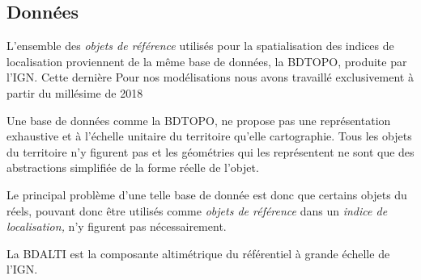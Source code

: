 \subsection{Données}

L'ensemble des \emph{objets de référence} utilisés pour la
spatialisation des indices de localisation proviennent de la même base
de données, la BDTOPO, produite par l'IGN. Cette dernière
%
Pour nos modélisations nous avons travaillé exclusivement à partir du
millésime de 2018


Une base de données comme la BDTOPO, ne propose pas une représentation
exhaustive et à l'échelle unitaire du territoire qu'elle
cartographie. Tous les objets du territoire n'y figurent pas et les
géométries qui les représentent ne sont que des abstractions
simplifiée de la forme réelle de l'objet.

Le principal problème d'une telle base de donnée est donc que certains
objets du réels, pouvant donc être utilisés comme \emph{objets de
  référence} dans un \emph{indice de localisation,} n'y figurent pas
nécessairement.


La BDALTI est la composante altimétrique du référentiel à grande
échelle de l'IGN.



